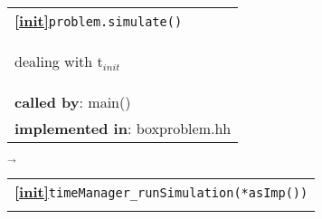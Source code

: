 \begin{landscape}
{%
  \begin{tabular}{|l|} \hline
    \textbf{\textcircled{\ref{init}}}\verb+problem.simulate()+ \\
    \begin{scriptsize}dealing with t$_{init}$\end{scriptsize}\\
    \textbf{called by}: main() \\
    \textbf{implemented in}: boxproblem.hh \\  
    \hline
  \end{tabular}
    $\overrightarrow{}$
  \begin{tabular}{|l|}\hline
    \textbf{\textcircled{\ref{init}}}\verb+timeManager_runSimulation(*asImp())+\\ 
    \begin{scriptsize}\end{scriptsize}\\

\end{tabular}}
\end{landscape}
